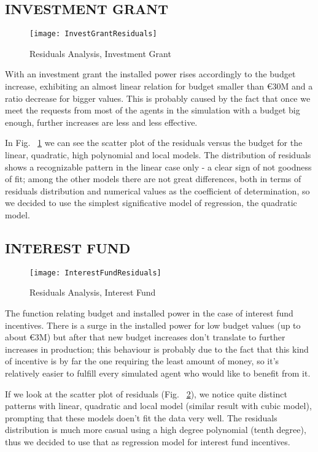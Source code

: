 \documentclass [twocolumn,a4paper,10pt]{ECMS}
\newcommand{\Subsection}[1]{\subsection*{#1}\vspace*{-0.7em}}
\begin{document}
\Subsection{INVESTMENT GRANT}

\begin{figure}[hbt]
	\centering
	\texttt{[image: InvestGrantResiduals]}
	\caption{Residuals Analysis, Investment Grant}
	\label{InvestGrantResiduals}
\end{figure}

With an investment grant the installed power rises accordingly to the budget increase, exhibiting an almost linear relation for budget smaller than \euro30M and a ratio decrease for bigger values. This is probably caused by the fact that once we meet the requests from most of the agents in the simulation with a budget big enough, further increases are less and less effective. 

In Fig. ~\ref{InvestGrantResiduals} we can see the scatter plot of the residuals versus the budget for the linear, quadratic, high polynomial and local models. The distribution of residuals shows a recognizable pattern in the linear case only - a clear sign of not goodness of fit; among the other models there are not great differences, both in terms of residuals distribution and numerical values as the coefficient of determination, so we decided to use the simplest significative model of regression, the quadratic model. 

\Subsection{INTEREST FUND}

\begin{figure}[hbt]
	\centering
	\texttt{[image: InterestFundResiduals]}
	\caption{Residuals Analysis, Interest Fund}
	\label{InterestFundResiduals}
\end{figure}

The function relating budget and installed power in the case of interest fund incentives. There is a surge in the installed power for low budget values (up to about \euro3M) but after that new budget increases don't translate to further increases in production; this behaviour is probably due to the fact that this kind of incentive is by far the one requiring the least amount of money, so it's relatively easier to fulfill every simulated agent who would like to benefit from it.

If we look at the scatter plot of residuals (Fig. ~\ref{InterestFundResiduals}), we notice quite distinct patterns with linear, quadratic and local model (similar result with cubic model), prompting that these models doen't fit the data very well. The residuals distribution is much more casual using a high degree polynomial (tenth degree), thus we decided to use that as regression model for interest fund incentives.
\end{document}
